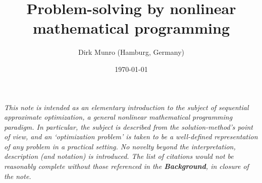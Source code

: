 \documentclass[11pt]{article}
\title{Problem-solving by nonlinear mathematical programming}
\author{Dirk Munro (Hamburg, Germany)}
\date{\today }
\begin{document}
\maketitle





\emph{This note is intended as an elementary introduction to the subject of {sequential approximate optimization}, a general nonlinear mathematical programming paradigm. In particular, the subject is described from the solution-method's point of view, and an `optimization problem' is taken to be a well-defined representation of any \emph{problem} %
in a practical setting. 
No novelty beyond the interpretation, description (and notation) is introduced. The list of citations would not be reasonably complete without those referenced in the \textbf{Background}, in closure of the note.}
\end{document}
